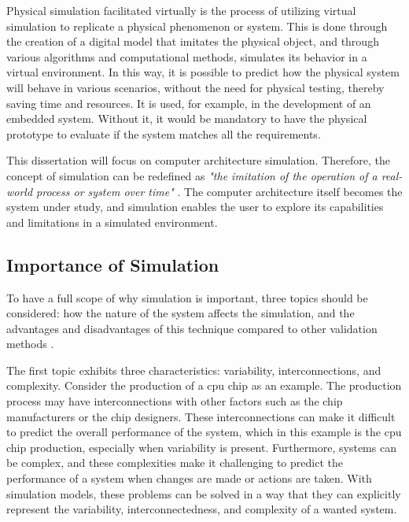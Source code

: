 Physical simulation facilitated virtually is the process of utilizing virtual simulation to replicate a physical phenomenon or system. This 
is done through the creation of a digital model that imitates the physical object, and through various algorithms and computational methods, 
simulates its behavior in a virtual environment. In this way, it is possible to predict how the physical system will behave in various scenarios, 
without the need for physical testing, thereby saving time and resources. It is used, for example, in the development of an embedded system. 
Without it, it would be mandatory to have the physical prototype to evaluate if the system matches all the requirements. 

This dissertation will focus on computer architecture simulation. Therefore, the concept of simulation can be redefined as \emph{"the imitation 
of the operation of a real-world process or system over time"} \cite{banks1999introduction}. The computer architecture itself becomes the system 
under study, and simulation enables the user to explore its capabilities and limitations in a simulated environment.

\subsection{Importance of Simulation}

To have a full scope of why simulation is important, three topics should be considered: how the nature of the system affects the simulation, and 
the advantages and disadvantages of this technique compared to other validation methods \cite{SimulationBook}.

The first topic exhibits three characteristics: variability, interconnections, and complexity. Consider the production of a \gls{cpu} chip as an 
example. The production process may have interconnections with other factors such as the chip manufacturers or the chip designers. These 
interconnections can make it difficult to predict the overall performance of the system, which in this example is the \gls{cpu} chip production, 
especially when variability is present. Furthermore, systems can be complex, and these complexities make it challenging to predict the performance 
of a system when changes are made or actions are taken. With simulation models, these problems can be solved in a way that they can explicitly 
represent the variability, interconnectedness, and complexity of a wanted system.

